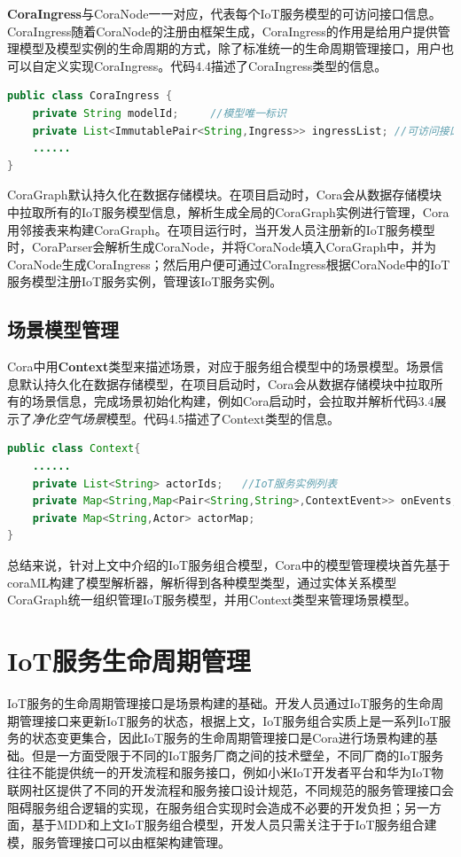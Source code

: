 \documentclass[winfonts,master,twoside]{njuthesis}
\begin{document}
\textbf{CoraIngress}与CoraNode一一对应，代表每个IoT服务模型的可访问接口信息。CoraIngress随着CoraNode的注册由框架生成，CoraIngress的作用是给用户提供管理模型及模型实例的生命周期的方式，除了标准统一的生命周期管理接口，用户也可以自定义实现CoraIngress。代码4.4描述了CoraIngress类型的信息。
\begin{lstlisting}[caption={CoraIngress类型信息},label={lst:CoraIngress},language=java,basicstyle=\footnotesize]
public class CoraIngress {
    private String modelId;     //模型唯一标识
    private List<ImmutablePair<String,Ingress>> ingressList; //可访问接口列表
    ......
}
\end{lstlisting}

CoraGraph默认持久化在数据存储模块。在项目启动时，Cora会从数据存储模块中拉取所有的IoT服务模型信息，解析生成全局的CoraGraph实例进行管理，Cora用邻接表来构建CoraGraph。在项目运行时，当开发人员注册新的IoT服务模型时，CoraParser会解析生成CoraNode，并将CoraNode填入CoraGraph中，并为CoraNode生成CoraIngress；然后用户便可通过CoraIngress根据CoraNode中的IoT服务模型注册IoT服务实例，管理该IoT服务实例。

\subsection{场景模型管理}
Cora中用\textbf{Context}类型来描述场景，对应于服务组合模型中的场景模型。场景信息默认持久化在数据存储模型，在项目启动时，Cora会从数据存储模块中拉取所有的场景信息，完成场景初始化构建，例如Cora启动时，会拉取并解析代码3.4展示了\textit{净化空气场景}模型。代码4.5描述了Context类型的信息。
\begin{lstlisting}[caption={Context类型信息},label={lst:Context},language=java,basicstyle=\footnotesize]
public class Context{
    ......
    private List<String> actorIds;   //IoT服务实例列表
    private Map<String,Map<Pair<String,String>,ContextEvent>> onEvents; 
    private Map<String,Actor> actorMap;
}
\end{lstlisting}

总结来说，针对上文中介绍的IoT服务组合模型，Cora中的模型管理模块首先基于coraML构建了模型解析器，解析得到各种模型类型，通过实体关系模型CoraGraph统一组织管理IoT服务模型，并用Context类型来管理场景模型。



\section{IoT服务生命周期管理}
IoT服务的生命周期管理接口是场景构建的基础。开发人员通过IoT服务的生命周期管理接口来更新IoT服务的状态，根据上文，IoT服务组合实质上是一系列IoT服务的状态变更集合，因此IoT服务的生命周期管理接口是Cora进行场景构建的基础。但是一方面受限于不同的IoT服务厂商之间的技术壁垒，不同厂商的IoT服务往往不能提供统一的开发流程和服务接口，例如小米IoT开发者平台和华为IoT物联网社区提供了不同的开发流程和服务接口设计规范，不同规范的服务管理接口会阻碍服务组合逻辑的实现，在服务组合实现时会造成不必要的开发负担；另一方面，基于MDD和上文IoT服务组合模型，开发人员只需关注于于IoT服务组合建模，服务管理接口可以由框架构建管理。
\end{document}
